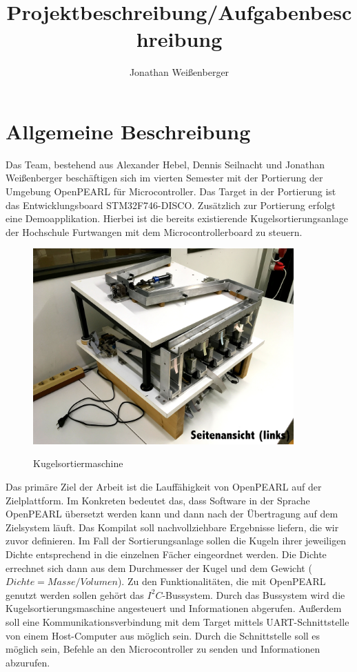 \documentclass[12pt,a4paper]{article}
\author{Jonathan Weißenberger}
\title{Projektbeschreibung/Aufgabenbeschreibung}
\begin{document}
\maketitle
\newpage
\tableofcontents
\newpage
\section{Allgemeine Beschreibung}
Das Team, bestehend aus Alexander Hebel, Dennis Seilnacht und Jonathan Weißenberger beschäftigen sich im vierten Semester mit der Portierung der Umgebung OpenPEARL für Microcontroller. Das Target in der Portierung ist das Entwicklungsboard STM32F746-DISCO. Zusätzlich zur Portierung erfolgt eine Demoapplikation. Hierbei ist die bereits existierende Kugelsortierungsanlage der Hochschule Furtwangen mit dem Microcontrollerboard zu steuern.
\begin{figure}[h]
\begin{center}
\caption{Kugelsortiermaschine}
\includegraphics[width=10cm]{grafiken/Seitenansicht.jpg}
\label{bild_kugelsortiermaschine}
\end{center}
\end{figure}
Das primäre Ziel der Arbeit ist die Lauffähigkeit von OpenPEARL auf der Zielplattform. Im Konkreten bedeutet das, dass Software in der Sprache OpenPEARL übersetzt werden kann und dann nach der Übertragung auf dem Zielsystem läuft. Das Kompilat soll nachvollziehbare Ergebnisse liefern, die wir zuvor definieren. Im Fall der Sortierungsanlage sollen die Kugeln ihrer jeweiligen Dichte entsprechend in die einzelnen Fächer eingeordnet werden. Die Dichte errechnet sich dann aus dem Durchmesser der Kugel und dem Gewicht ($Dichte=Masse/Volumen$). Zu den Funktionalitäten, die mit OpenPEARL genutzt werden sollen gehört das $I^2C$-Bussystem. Durch das Bussystem wird die Kugelsortierungsmaschine angesteuert und Informationen abgerufen. Außerdem soll eine Kommunikationsverbindung mit dem Target mittels UART-Schnittstelle von einem Host-Computer aus möglich sein. Durch die Schnittstelle soll es möglich sein, Befehle an den Microcontroller zu senden und Informationen abzurufen. 
\end{document}
